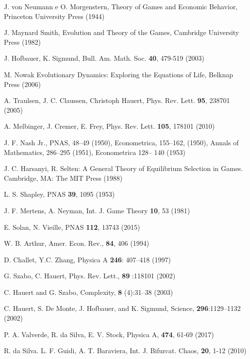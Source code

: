 \documentclass[3p, 11pt]{elsarticle}
\begin{document}
\begin{thebibliography}{99}
 J. von Neumann e O. Morgenstern, Theory of Games and
Economic Behavior, Princeton University Press (1944)

 J. Maynard Smith, Evolution and Theory of the
Games, Cambridge University Press (1982)

 J. Hofbauer, K. Sigmund, Bull. Am. Math. Soc. \textbf{%
40}, 479-519 (2003)

 M. Nowak Evolutionary Dynamics: Exploring the Equations
of Life, Belknap Press (2006)

 A. Traulsen, J. C. Claussen, Christoph Hauert, Phys.
Rev. Lett. \textbf{95}, 238701 (2005)

 A. Melbinger, J. Cremer, E. Frey, Phys. Rev. Lett. 
\textbf{105}, 178101 (2010)

 J. F. Nash Jr., PNAS, 48--49 (1950), Econometrica, 155--162,
(1950), Annals of Mathematics, 286--295 (1951), Econometrica 128-- 140 (1953)

 J. C. Harsanyi, R. Selten: A General Theory of
Equilibrium Selection in Games. Cambridge, MA: The MIT Press (1988)

 L. S. Shapley, PNAS \textbf{39}, 1095 (1953)

 J. F. Mertens, A. Neyman, Int. J. Game Theory \textbf{%
10}, 53 (1981)

 E. Solan, N. Vieille, PNAS \textbf{112}, 13743 (2015)

 W. B. Arthur, Amer. Econ. Rev., \textbf{84}, 406 (1994)

 D. Challet, Y.C. Zhang, Physica A \textbf{246}:
407--418 (1997)

 G. Szabo, C. Hauert, Phys. Rev. Lett., \textbf{89}%
:118101 (2002)

 C. Hauert and G. Szabo, Complexity, \textbf{8}%
(4):31--38 (2003)

 C. Hauert, S. De Monte, J. Hofbauer, and K.
Sigmund, Science, \textbf{296}:1129--1132 (2002)

 P. A. Valverde, R. da Silva, E. V. Stock, Physica A, 
\textbf{474}, 61-69 (2017)

 R. da Silva. L. F. Guidi, A. T. Baraviera, Int. J.
Bifurcat. Chaos, \textbf{20}, 1-12 (2010)


\end{thebibliography}
\end{document}
